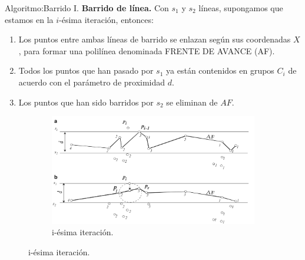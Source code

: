 
\begin{frame}[fragile]{Algoritmo:}{Barrido I.}
  \textbf{Barrido de línea.} Con $s_1$ y $s_2$ líneas, supongamos que estamos
  en la $i$-ésima iteración, entonces:
  \begin{enumerate}
  \item Los puntos entre ambas líneas de barrido se enlazan según sus coordenadas $X$,
    para formar una polilínea denominada FRENTE DE AVANCE (AF).
  \item Todos los puntos que han pasado por $s_1$ ya están contenidos en grupos $C_i$
    de acuerdo con el parámetro de proximidad $d$.
  \item Los puntos que han sido barridos por $s_2$ se eliminan de $AF$.
  \end{enumerate}
  \begin{figure}
    \centering
    \begin{subfigure}[b]{0.6\textwidth}
      \includegraphics[width=\textwidth]{./Imagenes/Barrido.png}
      \caption*{i-ésima iteración.}
    \end{subfigure}
  \end{figure}
\end{frame}

